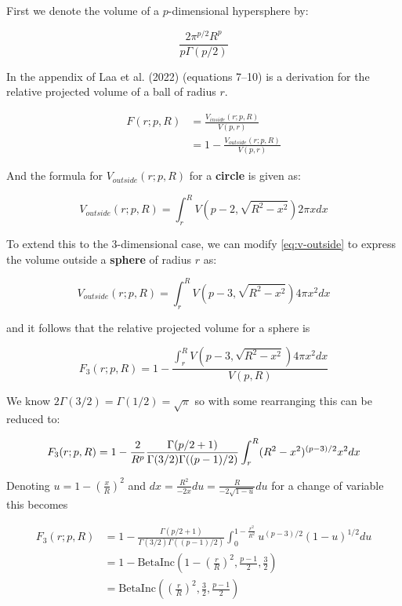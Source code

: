 First we denote the volume of a \(p\)-dimensional hypersphere by:

\[
\frac{2\pi^{p/2}R^p}{p\Gamma(p/2)}
\]

In the appendix of Laa et al. (2022) (equations 7--10) is a derivation for the relative projected volume of a ball of radius \(r\).

\begin{align}
    F(r; p, R) &= \frac{V_{inside}(r; p, R)}{ V(p, r) } \\
    &= 1 - \frac{V_{outside}(r; p, R)}{ V(p, r) }
    \label{eq:F2}
\end{align}

And the formula for \(V_{outside}(r; p, R)\) for a \textbf{circle} is given as:

\begin{equation}
V_{outside}(r; p, R) =
\int_r^R V(p-2, \sqrt{R^2 - x^2})2\pi x dx 
\label{eq:v-outside}
\end{equation}

To extend this to the 3-dimensional case, we can modify \eqref{eq:v-outside} to express the volume outside a \textbf{sphere} of radius \(r\) as:

\begin{equation}
  V_{outside}(r; p, R) = \int_r^R V(p-3, \sqrt{R^2 - x^2})4\pi x^2 dx
\end{equation}

and it follows that the relative projected volume for a sphere is

\begin{equation}
  F_3(r; p, R) = 1 - 
  \frac{
      \int_r^R V(p-3, \sqrt{R^2 - x^2})4\pi x^2 dx
  }{
      V(p, R)
  } 
\end{equation}

We know \(2\Gamma(3/2) = \Gamma(1/2) = \sqrt{ \pi }\) so with some rearranging this can be reduced to:

\begin{equation}
  F_3(r; p, R) = 1 - \frac{2}{R^p} \frac{\Gamma(p/2+1)}{\Gamma(3/2)\Gamma((p-1)/2)}
  \int_r^R (R^2 - x^2)^{(p-3)/2} x^2 dx \\
\end{equation}

Denoting \(u = 1 - \left(\frac{x}{R}\right)^2\) and \(dx = \frac{R^2}{-2x}du = \frac{R}{-2\sqrt{1-u}}du\) for a change of variable this becomes

\begin{align}
  F_3(r; p, R) &= 1 - \frac{\Gamma(p/2+1)}{\Gamma(3/2)\Gamma((p-1)/2)}
  \int_0^{1-\frac{r^2}{R^2}} u^{(p-3)/2} (1-u)^{1/2} du \\
  &= 1 - \mathrm{BetaInc}\left(1-\left(\frac{r}{R}\right)^2, \frac{p-1}{2}, \frac{3}{2}\right) \\
  &= \mathrm{BetaInc}\left(\left(\frac{r}{R}\right)^2, \frac{3}{2}, \frac{p-1}{2}\right) 
  \label{eq:betainc1}
\end{align}

